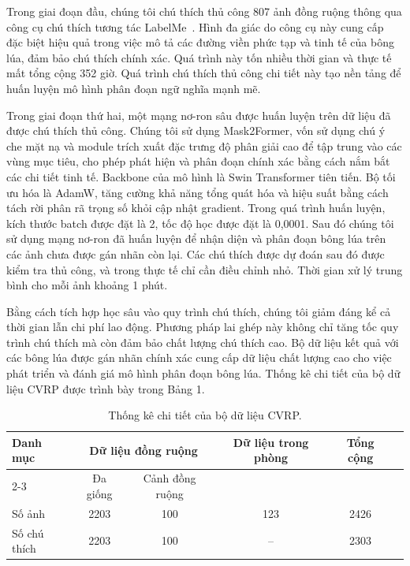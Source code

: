 \documentclass[12pt, a4paper]{article}
\begin{document}
Trong giai đoạn đầu, chúng tôi chú thích thủ công 807 ảnh đồng ruộng thông qua công cụ chú
thích tương tác LabelMe~\cite{russell2008}. Hình đa giác do công cụ này cung cấp đặc biệt
hiệu quả trong việc mô tả các đường viền phức tạp và tinh tế của bông lúa, đảm bảo chú thích
chính xác. Quá trình này tốn nhiều thời gian và thực tế mất tổng cộng 352 giờ. Quá trình chú
thích thủ công chi tiết này tạo nền tảng để huấn luyện mô hình phân đoạn ngữ nghĩa mạnh mẽ.

Trong giai đoạn thứ hai, một mạng nơ-ron sâu được huấn luyện trên dữ liệu đã được chú thích
thủ công. Chúng tôi sử dụng Mask2Former, vốn sử dụng chú ý che mặt nạ và module trích xuất
đặc trưng độ phân giải cao để tập trung vào các vùng mục tiêu, cho phép phát hiện và phân
đoạn chính xác bằng cách nắm bắt các chi tiết tinh tế. Backbone của mô hình là Swin
Transformer tiên tiến. Bộ tối ưu hóa là AdamW, tăng cường khả năng tổng quát hóa và hiệu
suất bằng cách tách rời phân rã trọng số khỏi cập nhật gradient. Trong quá trình huấn luyện,
kích thước batch được đặt là 2, tốc độ học được đặt là 0,0001. Sau đó chúng tôi sử dụng mạng
nơ-ron đã huấn luyện để nhận diện và phân đoạn bông lúa trên các ảnh chưa được gán nhãn còn
lại. Các chú thích được dự đoán sau đó được kiểm tra thủ công, và trong thực tế chỉ cần điều
chỉnh nhỏ. Thời gian xử lý trung bình cho mỗi ảnh khoảng 1 phút.

Bằng cách tích hợp học sâu vào quy trình chú thích, chúng tôi giảm đáng kể cả thời gian lẫn
chi phí lao động. Phương pháp lai ghép này không chỉ tăng tốc quy trình chú thích mà còn đảm
bảo chất lượng chú thích cao. Bộ dữ liệu kết quả với các bông lúa được gán nhãn chính xác
cung cấp dữ liệu chất lượng cao cho việc phát triển và đánh giá mô hình phân đoạn bông lúa.
Thống kê chi tiết của bộ dữ liệu CVRP được trình bày trong Bảng 1.

\begin{table}[ht]
  \centering
  \caption{Thống kê chi tiết của bộ dữ liệu CVRP.}
  \label{tab:dataset_stats}
  \begin{tabular}{lccccc}
    \toprule
    \textbf{Danh mục} & \multicolumn{2}{c}{\textbf{Dữ liệu đồng ruộng}} & \textbf{Dữ liệu trong phòng} & \textbf{Tổng cộng} \\
    \cmidrule(lr){2-3}
    & Đa giống & Cảnh đồng ruộng & & \\
    \midrule
    Số ảnh       & 2203 & 100 & 123 & 2426 \\
    Số chú thích & 2203 & 100 & --  & 2303 \\
    \bottomrule
  \end{tabular}
\end{table}
\end{document}
